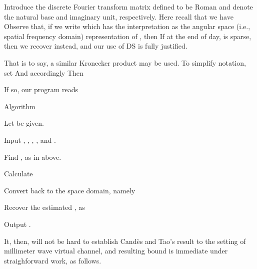 \stopsection
\startsection [title={Working in the Angular Space}]

Introduce the discrete Fourier transform matrix  defined to be
%
%
Roman  and  denote the natural base and imaginary unit, respectively.
Here recall that we have
%
%
Observe that, if we write
%
%
which has the interpretation as the angular space (i.e., spatial frequency domain) representation of , then
%
%
If at the end of day,  is sparse, then we recover  instead, and our use of DS is fully justified.

That is to say, a similar Kronecker product may be used.
To simplify notation, set
%
%
And accordingly
%
%
Then
%

\stopsection
\startsection [title={Proposed Method}]

If so, our program reads

\Result
{Algorithm}
{
\startitemize[n]
\item Let  be given.
\item Input ,
,
,
,
and .
\item Find ,  as in above.
\item Calculate
%
\item Convert  back to the space domain, namely
%
\item Recover the estimated , as
%
\item Output .
\stopitemize
}

It, then, will not be hard to establish Cand\`es and Tao's result to the setting of millimeter wave virtual channel, and resulting bound is immediate under straighforward work, as follows.

\stopsection
\stopchapter
